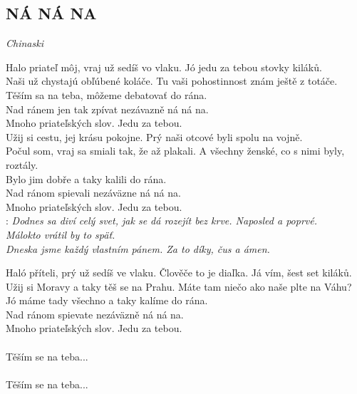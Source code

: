 \begin{flushleft}
	\section*{\Huge NÁ NÁ NA}
	\emph{Chinaski}
\end{flushleft}
\begin{Large}

\textcolor{mygray}{Halo priateľ môj, vraj už sedíš vo vlaku.} Jó jedu za tebou stovky kiláků.\\
\textcolor{mygray}{Naši už chystajú obľúbené koláče.} Tu vaši pohostinnost znám ještě z totáče.\\

\textcolor{mygray}{Těším sa na teba, môžeme debatovať do rána.}\\
Nad ránem jen tak zpívat nezávazně ná ná na.\\
\textcolor{mygray}{Mnoho priateľských slov.} Jedu za tebou.\\

\textcolor{mygray}{Užij si cestu, jej krásu pokojne.} Prý naši otcové byli spolu na vojně.\\
\textcolor{mygray}{Počul som, vraj sa smiali tak, že až plakali.} A všechny ženské, co s nimi byly, roztály.\\

Bylo jim dobře a taky kalili do rána.\\
\textcolor{mygray}{Nad ránom spievali nezáväzne ná ná na.\\ 
Mnoho priateľských slov.} Jedu za tebou.\\

\textregistered: \emph{
\textcolor{mygray}{Dodnes sa diví celý svet,} jak se dá rozejít bez krve. Naposled a poprvé.\\
\textcolor{mygray}{Málokto vrátil by to späť.}\\
Dneska jsme každý vlastním pánem. Za to díky, čus a ámen.\\
}

Haló příteli, prý už sedíš ve vlaku. \textcolor{mygray}{Člověče to je diaľka.} Já vím, šest set kiláků.\\
Užij si Moravy a taky těš se na Prahu. \textcolor{mygray}{Máte tam niečo ako naše plte na Váhu?}\\ 

Jó máme tady všechno a taky kalíme do rána.\\
\textcolor{mygray}{Nad ránom spievate nezáväzně ná ná na.\\
Mnoho priateľských slov.} Jedu za tebou.\\

\textregistered\\
\textcolor{mygray}{Těším se na teba...}\\
\textregistered\\
\textcolor{mygray}{Těším se na teba...}

\end{Large}

\newpage
